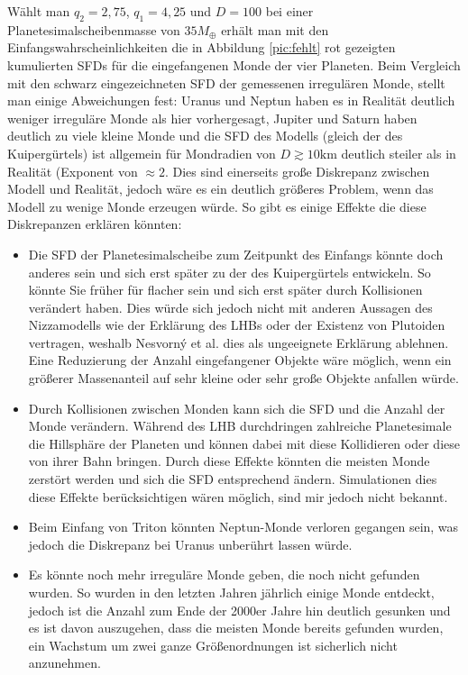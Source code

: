 \documentclass[10pt,a4paper,twoside]{article}
\begin{document}
Wählt man $q_2 = 2,75$, $q_1 = 4,25$ und $D = 100$ bei einer Planetesimalscheibenmasse von $35M_\oplus$ erhält man mit den  Einfangswahrscheinlichkeiten die in Abbildung \ref{pic:fehlt} rot gezeigten kumulierten SFDs für die eingefangenen Monde der vier Planeten. %
Beim Vergleich mit den schwarz eingezeichneten SFD der gemessenen irregulären Monde, %
stellt man einige Abweichungen fest:
Uranus und Neptun haben es in Realität deutlich weniger irreguläre Monde als hier vorhergesagt, %
Jupiter und Saturn haben deutlich zu viele kleine Monde und die SFD des Modells (gleich der des Kuipergürtels) ist allgemein für Mondradien von $D\gtrsim 10 \mathrm{km}$ deutlich steiler als in Realität (Exponent von $\approx2$\cite{Nesvorny2007}.
Dies sind einerseits große Diskrepanz zwischen Modell und Realität, jedoch wäre es ein deutlich größeres Problem, wenn das Modell zu wenige Monde erzeugen würde. So gibt es einige Effekte die diese Diskrepanzen erklären könnten:
\begin{itemize}
\item Die SFD der Planetesimalscheibe zum Zeitpunkt des Einfangs könnte doch anderes sein und sich erst später zu der des Kuipergürtels entwickeln.
So könnte Sie früher für flacher sein und sich erst später durch Kollisionen verändert haben. Dies würde sich jedoch nicht mit anderen Aussagen des Nizzamodells wie der Erklärung des LHBs oder der Existenz von Plutoiden vertragen, %
weshalb Nesvorný et al. dies als ungeeignete Erklärung ablehnen\cite{Nesvorny2007}.
Eine Reduzierung der Anzahl eingefangener Objekte wäre möglich, wenn ein größerer Massenanteil auf sehr kleine oder sehr große Objekte anfallen würde\cite{Nesvorny2007}. %
\item Durch Kollisionen zwischen Monden kann sich die SFD und die Anzahl der Monde verändern. Während des LHB durchdringen zahlreiche Planetesimale die Hillsphäre der Planeten und können dabei mit diese Kollidieren oder diese von ihrer Bahn bringen\cite{Nesvorny2007}. Durch diese Effekte könnten die meisten Monde zerstört werden und sich die SFD entsprechend ändern. Simulationen dies diese Effekte berücksichtigen wären möglich, sind mir jedoch nicht bekannt. %
\item Beim Einfang von Triton könnten Neptun-Monde verloren gegangen sein, was jedoch die Diskrepanz bei Uranus unberührt lassen würde\cite{Nesvorny2007}. %
\item Es könnte noch mehr irreguläre Monde geben, die noch nicht gefunden wurden. So wurden in den letzten Jahren jährlich einige Monde entdeckt, jedoch ist die Anzahl zum Ende der 2000er Jahre hin deutlich gesunken und es ist davon auszugehen, dass die meisten Monde bereits gefunden wurden, ein Wachstum um zwei ganze Größenordnungen ist sicherlich nicht anzunehmen.
\end{itemize}
\end{document}
